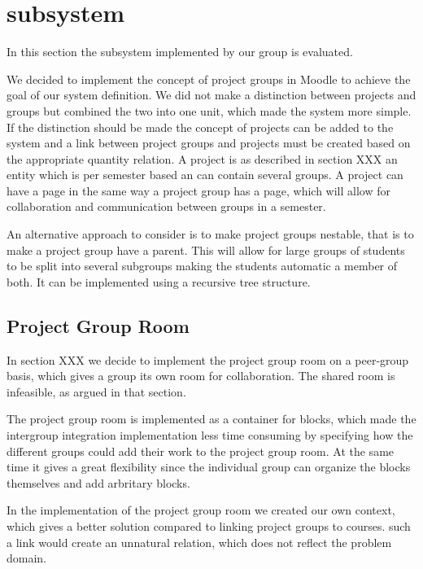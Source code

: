 \section{subsystem}
In this section the subsystem implemented by our group is evaluated. 

We decided to implement the concept of project groups in Moodle to achieve the goal of our \system{} system definition. 
We did not make a distinction between projects and groups but combined the two into one unit, which made the system more simple. 
If the distinction should be made the concept of projects can be added to the system and a link between project groups and projects must be created based on the appropriate quantity relation. 
A project is as described in section XXX an entity which is per semester based an can contain several groups. 
A project can have a page in the same way a project group has a page, which will allow for collaboration and communication between groups in a semester. 

An alternative approach to consider is to make project groups nestable, that is to make a project group have a parent.
This will allow for large groups of students to be split into several subgroups making the students automatic a member of both. 
It can be implemented using a recursive tree structure.




\subsection{Project Group Room}
In section XXX we decide to implement the project group room on a peer-group basis, which gives a group its own room for collaboration. 
The shared room is infeasible, as argued in that section.

The project group room is implemented as a container for blocks, which  made the intergroup integration implementation less time consuming by specifying how the different groups could add their work to the project group room. 
At the same time it gives a great flexibility since the individual group can organize the blocks themselves and add arbritary blocks.

In the implementation of the project group room we created our own context,  which gives a better solution compared to linking project groups to courses. 
such a link would create an unnatural relation, which does not reflect the problem domain.   



